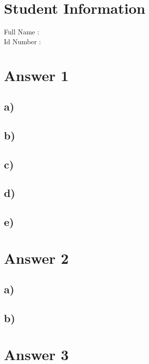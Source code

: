 \documentclass[12pt]{article}
\begin{document}
\section*{Student Information } 
Full Name :  \\
Id Number :  \\

\section*{Answer 1}

\subsection*{a)} 

\subsection*{b)} 

\subsection*{c)} 

\subsection*{d)} 

\subsection*{e)} 


\section*{Answer 2}

\subsection*{a)} 

\subsection*{b)} 


\section*{Answer 3}
\end{document}

